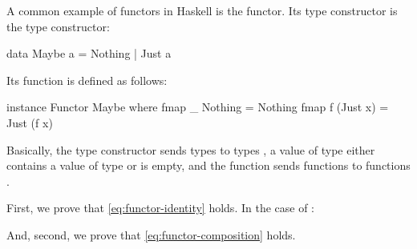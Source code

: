 
\begin{example}
  \label{ex:functor-maybe-haskell}


  A common example of functors in Haskell is the 
  functor. Its type constructor is the  type
  constructor:
  \begin{codehaskell}
data Maybe a = Nothing | Just a
  \end{codehaskell}
  Its  function is defined as follows:
  \begin{codehaskell}
instance Functor Maybe where
  fmap _ Nothing  = Nothing
  fmap f (Just x) = Just (f x)
  \end{codehaskell}
  Basically, the  type constructor sends types
   to types , a value of type
   either contains a value of type
   or is empty, and the  function
  sends functions  to functions .

  First, we prove that \eqref{eq:functor-identity} holds. In the case
  of :

  \vspace{1em}
  \begin{steps}
  \end{steps}
  \begin{steps}
  \end{steps}

  And, second, we prove that \eqref{eq:functor-composition} holds.

  \vspace{1em}
  \begin{steps}
  \end{steps}
  \begin{steps}
  \end{steps}

\end{example}

